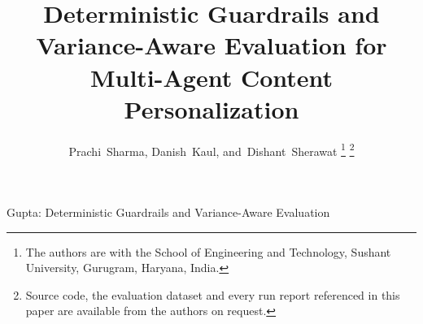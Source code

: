 \documentclass[journal]{IEEEtran}
\begin{document}
\title{Deterministic Guardrails and Variance-Aware Evaluation
for Multi-Agent Content Personalization}

\author{
  Prachi~Sharma,
  Danish~Kaul,
  and~Dishant~Sherawat%
  \thanks{The authors are with the School of Engineering and Technology,
  Sushant University, Gurugram, Haryana, India.}%
  \thanks{Source code, the evaluation dataset and every run report referenced
  in this paper are available from the authors on request.}
}

%
{Gupta: Deterministic Guardrails and Variance-Aware Evaluation}

\maketitle
\end{document}
